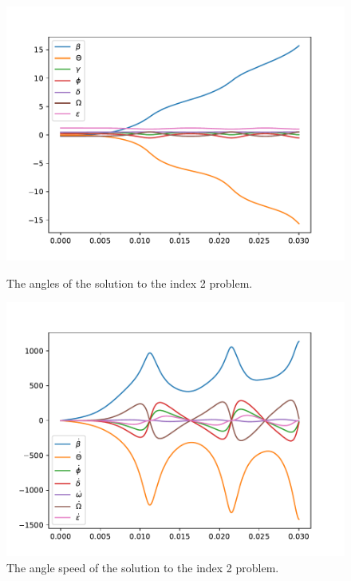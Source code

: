 \documentclass{report}
\begin{document}
\begin{figure}[h]
\centering
\begin{minipage}[t]{0.45\textwidth}
\centering
\includegraphics[width=\textwidth]{../Plots/Project2_main/Figure_510}
\caption{The angles of the solution to the index 2 problem.}
\label{pl:indx3_soln_angles}
\end{minipage}
\hfill
\begin{minipage}[t]{0.45\textwidth}
\centering
\includegraphics[width=\textwidth]{../Plots/Project2_main/Figure_511}
\caption{The angle speed of the solution to the index 2 problem.}
\label{pl:indx3_soln_anglesdot}
\end{minipage}
\end{figure}
\end{document}
